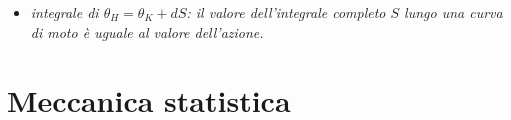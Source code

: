 \documentclass{article}
\theoremstyle{remark}
\begin{document}
\begin{itemize}
\begin{enumerate}
        \item trovare un integrale completo;
        \item ricavare i cambiamento di coordinate $(q,p)\to(Q,P)$;
        \item convertire il dato iniziale $(q(0),p(0))\to(Q(0),P(0))$ dato che l'integrale delle nuove equazioni di Hamilton è $Q^\mu(t)=Q^\mu(0),\,P_\mu(t)=P_\mu(0)$;
        \item l'espressione della curva di moto in $(Q,P)$ è
        \begin{equation}
            \begin{cases}
                q(t)=q(Q(0),P(0),t) \\
                p(t)=p(Q(0),P(0),t);
            \end{cases}
        \end{equation}
    \end{enumerate}
    \item \textit{integrale di $\theta_H=\theta_K+dS$: il valore dell'integrale completo $S$ lungo una curva di moto è uguale al valore dell'azione.}
\end{itemize}
\newpage
\section{Meccanica statistica}
\end{document}
